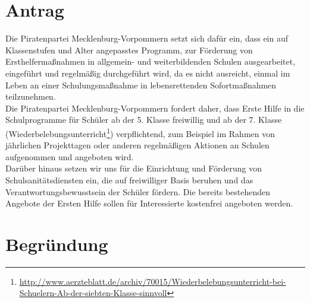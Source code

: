 \section{Antrag}

Die Piratenpartei Mecklenburg-Vorpommern setzt sich dafür ein, dass ein auf Klassenstufen und Alter angepasstes Programm, zur Förderung von Ersthelfermaßnahmen in allgemein- und weiterbildenden Schulen ausgearbeitet, eingeführt und regelmäßig durchgeführt wird, da es nicht ausreicht, einmal im Leben an einer Schulungsmaßnahme in lebensrettenden Sofortmaßnahmen teilzunehmen.\\Die Piratenpartei Mecklenburg-Vorpommern fordert daher, dass Erste Hilfe in die Schulprogramme für Schüler ab der 5. Klasse freiwillig und ab der 7. Klasse (Wiederbelebungsunterricht\footnote{\url{http://www.aerzteblatt.de/archiv/70015/Wiederbelebungsunterricht-bei-Schuelern-Ab-der-siebten-Klasse-sinnvoll}}) verpflichtend, zum Beispiel im Rahmen von jährlichen Projekttagen oder anderen regelmäßigen Aktionen an Schulen aufgenommen und angeboten wird.\\Darüber hinaus setzen wir uns für die Einrichtung und Förderung von Schulsanitätsdiensten ein, die auf freiwilliger Basis beruhen und das Verantwortungsbewusstsein der Schüler fördern. Die bereits bestehenden Angebote der Ersten Hilfe sollen für Interessierte kostenfrei angeboten werden.

\section{Begründung}

